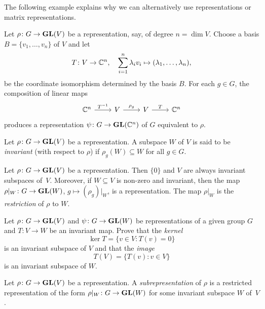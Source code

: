 The following example explains why we can alternatively use
representations or matrix representations. 

\begin{example}
\label{exa:change_of_basis}
Let $\rho\colon G\to\mathbf{GL}(V)$ be a representation, say, of degree 
$n=\dim V$. Choose a basis 
$B=\{v_1,\dots,v_n\}$ of $V$ and let 
\[
T\colon V\to\mathbb{C}^n,
\quad
\sum_{i=1}^n\lambda_iv_i\mapsto (\lambda_1,\dots,\lambda_n),
\]
be the coordinate isomorphism determined by 
the basis $B$. For each $g\in G$, 
the composition of linear maps 
\[\begin{tikzcd}
	{\C^n} & V & V & {\C^n}
	\arrow["{T^{-1}}", from=1-1, to=1-2]
	\arrow["{\rho_g}", from=1-2, to=1-3]
	\arrow["T", from=1-3, to=1-4]
\end{tikzcd}
\]
produces a representation 
$\psi\colon G\to\mathbf{GL}(\mathbb{C}^n)$
of $G$ equivalent to $\rho$.   
\end{example}



\begin{definition}
    Let $\rho\colon G\to\mathbf{GL}(V)$ be a representation. 
    A subspace $W$ of $V$ is said to be \emph{invariant} (with respect to $\rho$)
    if $\rho_g(W)\subseteq W$ for all $g\in G$.
\end{definition}

Let $\rho\colon G\to\mathbf{GL}(V)$ be a representation. Then $\{0\}$ and $V$ are always   
invariant subspaces of~$V$. Moreover, if $W\subseteq V$ is non-zero and 
invariant, then
the map $\rho|_W\colon G\to\mathbf{GL}(W)$, $g\mapsto (\rho_g)|_W$, is a representation. The
map $\rho|_W$ is the \emph{restriction} of $\rho$ to $W$. 

\begin{exercise}
	Let $\rho\colon G\to\mathbf{GL}(V)$ and $\psi\colon G\to\mathbf{GL}(W)$ be representations of a given group $G$ 
	and 
 $T\colon V\to W$ be an invariant map. Prove that the \emph{kernel} 
	\[
	\ker T=\{v\in V:T(v)=0\}
	\]
	is an invariant subspace of $V$ and that the \emph{image} 
	\[
		T(V)=\{T(v):v\in V\}
	\]
	is an invariant subspace of $W$. 
\end{exercise}


\begin{definition}
    Let $\rho\colon G\to\mathbf{GL}(V)$
    be a representation. A \emph{subrepresentation} of $\rho$ is a restricted representation 
    of the form $\rho|_W\colon G\to\mathbf{GL}(W)$ for some invariant subspace $W$ of~$V$.
\end{definition}

